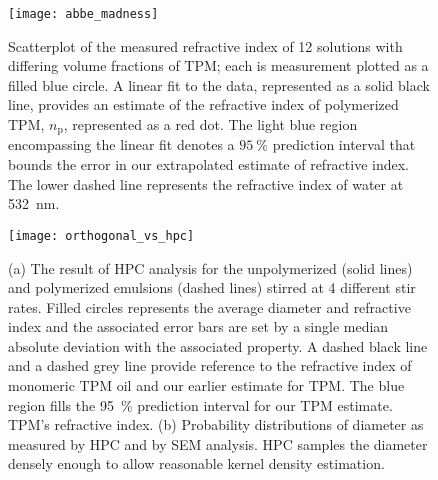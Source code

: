\begin{figure}
    \centering
    \texttt{[image: abbe\_madness]}
    \caption{Scatterplot of the measured refractive index of \num{12} solutions
      with differing volume fractions of TPM; each is measurement plotted as a filled
      blue circle.
      A linear fit to the data, represented as a solid black line, provides an estimate of
      the refractive index of polymerized TPM, $n_{\text{p}}$, represented as a red dot.
      The light blue region encompassing the linear fit denotes a $\SI{95}{\percent}$
      prediction interval that bounds the error in our extrapolated estimate of refractive
      index.
      The lower dashed line represents the refractive index of water at \SI{532}{\nm}.}
    \label{fig:abbe}
\end{figure}


\begin{figure}
    \centering
    \texttt{[image: orthogonal\_vs\_hpc]}
    \caption{(a) The result of HPC analysis for the unpolymerized (solid lines) and polymerized
      emulsions (dashed lines) stirred at \num{4} different stir rates. Filled circles
      represents the average diameter and refractive index and the associated error bars
      are set by a single median absolute deviation with the associated property.
      A dashed black line and a dashed grey line provide reference to the
      refractive index of monomeric TPM oil and our earlier estimate for TPM. The blue region
      fills the \SI{95}{\percent} prediction interval for our TPM estimate.
      TPM's refractive index. (b) Probability distributions of diameter as measured by
      HPC and by SEM analysis. HPC samples the diameter densely enough to allow
      reasonable kernel density estimation.}
    \label{fig:hpc_stir_rate}
\end{figure}


